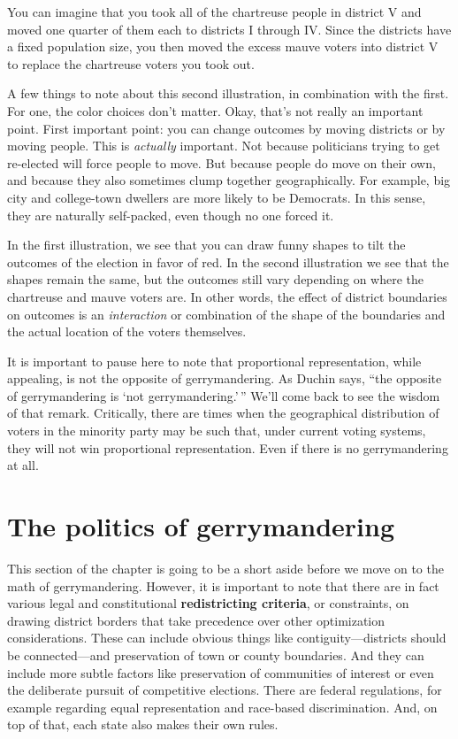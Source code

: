 \documentclass[
  openany]{book}
\begin{document}
You can imagine that you took all of the chartreuse people in district V and moved one quarter of them each to districts I through IV. Since the districts have a fixed population size, you then moved the excess mauve voters into district V to replace the chartreuse voters you took out.

A few things to note about this second illustration, in combination with the first. For one, the color choices don't matter. Okay, that's not really an important point. First important point: you can change outcomes by moving districts or by moving people. This is \emph{actually} important. Not because politicians trying to get re-elected will force people to move. But because people do move on their own, and because they also sometimes clump together geographically. For example, big city and college-town dwellers are more likely to be Democrats. In this sense, they are naturally self-packed, even though no one forced it.

In the first illustration, we see that you can draw funny shapes to tilt the outcomes of the election in favor of red. In the second illustration we see that the shapes remain the same, but the outcomes still vary depending on where the chartreuse and mauve voters are. In other words, the effect of district boundaries on outcomes is an \emph{interaction} or combination of the shape of the boundaries and the actual location of the voters themselves.

\begin{tipblock}
It is important to pause here to note that proportional representation, while appealing, is not the opposite of gerrymandering. As Duchin says, ``the opposite of gerrymandering is `not gerrymandering.'\,'' We'll come back to see the wisdom of that remark. Critically, there are times when the geographical distribution of voters in the minority party may be such that, under current voting systems, they will not win proportional representation. Even if there is no gerrymandering at all.

\end{tipblock}

\hypertarget{the-politics-of-gerrymandering}{%
\section*{The politics of gerrymandering}\label{the-politics-of-gerrymandering}}

This section of the chapter is going to be a short aside before we move on to the math of gerrymandering. However, it is important to note that there are in fact various legal and constitutional \textbf{redistricting criteria}, or constraints, on drawing district borders that take precedence over other optimization considerations. These can include obvious things like contiguity---districts should be connected---and preservation of town or county boundaries. And they can include more subtle factors like preservation of communities of interest or even the deliberate pursuit of competitive elections. There are federal regulations, for example regarding equal representation and race-based discrimination. And, on top of that, each state also makes their own rules.
\end{document}

